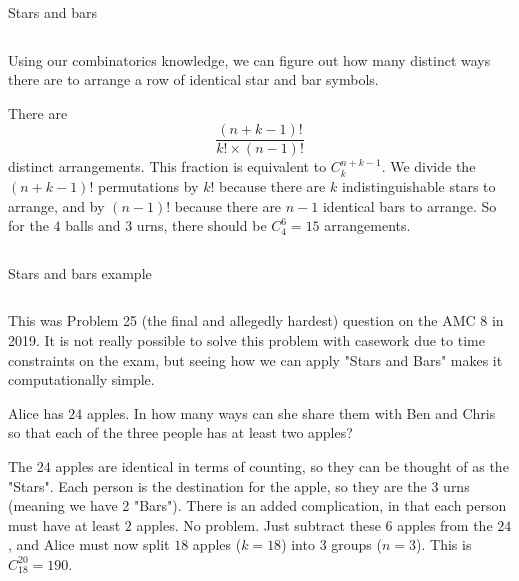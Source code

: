 \documentclass[9pt,aspectratio=169]{beamer}
\begin{document}
\begin{frame}{Stars and bars}
\begin{columns}[T]
\begin{column}{0.5\textwidth}
      Using our combinatorics knowledge, we can figure out how many distinct ways there are to arrange a row of identical star and bar symbols. 

      There are 
      \[ \frac{(n + k - 1)!}{k! \times (n - 1)!} \]
      distinct arrangements.  This fraction is equivalent to $C^{n + k - 1}_k$.  We divide the $(n + k - 1)!$ permutations by $k!$ because there are $k$ indistinguishable stars to arrange, and by $(n - 1)!$ because there are $n - 1$ identical bars to arrange.  So for the $4$ balls and $3$ urns, there should be $C^6_4 = 15$ arrangements.
    \end{column}
  \end{columns}
\end{frame}

\begin{frame}{Stars and bars example}
  \begin{columns}[T]
    \begin{column}{0.5\textwidth}
      This was Problem 25 (the final and allegedly hardest) question on the AMC 8 in 2019.  It is not really possible to solve this problem with casework due to time constraints on the exam, but seeing how we can apply "Stars and Bars" makes it computationally simple.
      \begin{problem}
        Alice has $24$ apples.  In how many ways can she share them with Ben and Chris so that each of the three people has at least two apples?
      \end{problem}

      The $24$ apples are identical in terms of counting, so they can be thought of as the "Stars".  Each person is the destination for the apple, so they are the $3$ urns (meaning we have 2 "Bars").  There is an added complication, in that each person must have at least $2$ apples.  No problem.  Just subtract these $6$ apples from the $24$, and Alice must now split $18$ apples ($k = 18$) into $3$ groups ($n = 3$).  This is $C^{20}_{18} = 190$.


\end{column}
\end{columns}
\end{frame}
\end{document}
